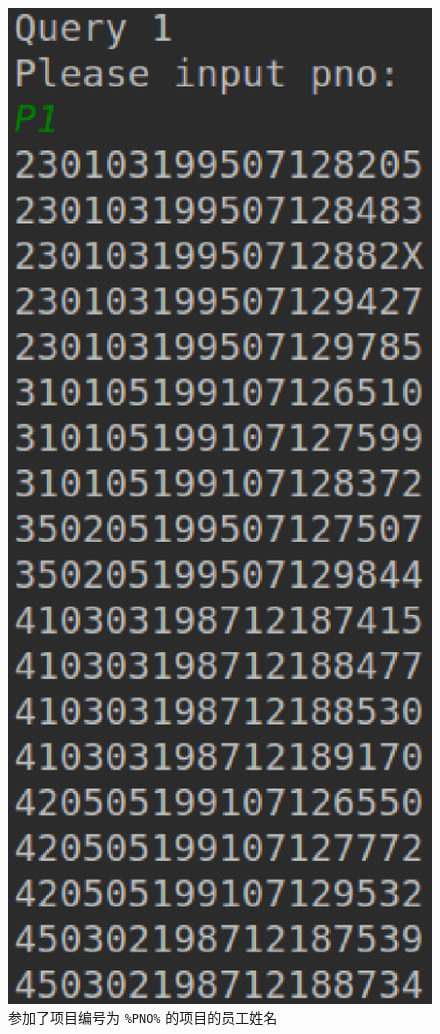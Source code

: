 \documentclass{ML}
\begin{document}
\begin{enumerate}
\begin{figure}[H]
        \includegraphics[scale=0.4, bb=0 0 217 485]{media/3.1.eps}
        \caption{参加了项目编号为 \texttt{\%PNO\%} 的项目的员工姓名}\label{fig:3.1}
    \end{figure}
    \newpage

\end{enumerate}
\end{document}
